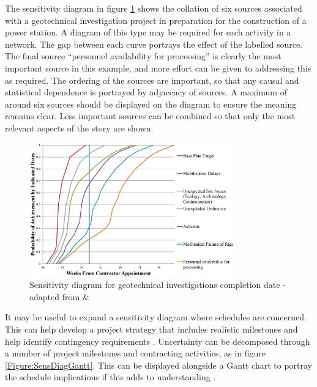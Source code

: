 The sensitivity diagram in figure \ref{Figure:SensDiag} shows the collation of six sources associated with a geotechnical investigation project in preparation for the construction of a power station.
A diagram of this type may be required for each activity in a network.
The gap between each curve portrays the effect of the labelled source.
The final source ``personnel availability for processing'' is clearly the most important source in this example, and more effort can be given to addressing this as required. 
The ordering of the sources are important, so that any causal and statistical dependence is portrayed by adjacency of sources.
A maximum of around six sources should be displayed on the diagram to ensure the meaning remains clear.
Less important sources can be combined so that only the most relevant aspects of the story are shown.

\begin{figure}[!h]
  \centering
    \includegraphics[width = 0.79\textwidth]{./Figures/Sensitivity_Diagram.png} 
\caption{Sensitivity diagram for geotechnical investigations completion date - adapted from \cite{chapman} \& \cite{hopkinson2008}}
\label{Figure:SensDiag}
\end{figure}

It may be useful to expand a sensitivity diagram where schedules are concerned. 
This can help develop a project strategy that includes realistic milestones and help identify contingency requirements \citep{hopkinson2008}.
Uncertainty can be decomposed through a number of project milestones and contracting activities, as in figure \ref{Figure:SensDiagGantt}.
This can be displayed alongside a Gantt chart to portray the schedule implications if this adds to understanding \citep{hopkinson2008}.

